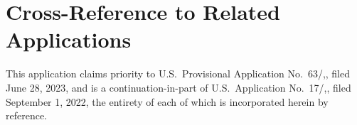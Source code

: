 \section{Cross-Reference to Related Applications}\label{sec:crossref}

This application claims priority to U.S.\ Provisional Application No.\ 63/,,
filed June 28, 2023, and is a continuation-in-part of U.S.\ Application No.\
17/,, filed September 1, 2022, the entirety of each of which is incorporated
herein by reference.


